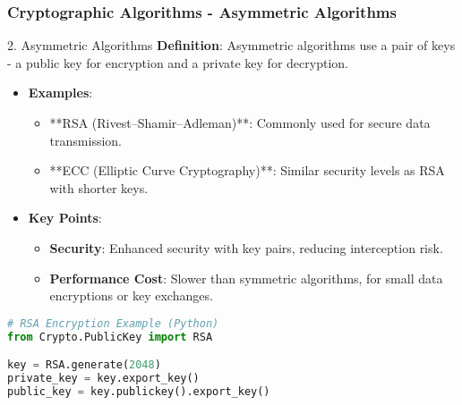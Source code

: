 \documentclass{beamer}
\begin{document}
\begin{frame}[fragile]
    \frametitle{Cryptographic Algorithms - Asymmetric Algorithms}
    \begin{block}{2. Asymmetric Algorithms}
        \textbf{Definition}: Asymmetric algorithms use a pair of keys - a public key for encryption and a private key for decryption.

        \begin{itemize}
            \item \textbf{Examples}:
            \begin{itemize}
                \item **RSA (Rivest–Shamir–Adleman)**: Commonly used for secure data transmission.
                \item **ECC (Elliptic Curve Cryptography)**: Similar security levels as RSA with shorter keys.
            \end{itemize}
            \item \textbf{Key Points}:
            \begin{itemize}
                \item \textbf{Security}: Enhanced security with key pairs, reducing interception risk.
                \item \textbf{Performance Cost}: Slower than symmetric algorithms, for small data encryptions or key exchanges.
            \end{itemize}
        \end{itemize}
    \end{block}
    \begin{lstlisting}[language=Python]
# RSA Encryption Example (Python)
from Crypto.PublicKey import RSA

key = RSA.generate(2048)
private_key = key.export_key()
public_key = key.publickey().export_key()
    \end{lstlisting}
\end{frame}
\end{document}
